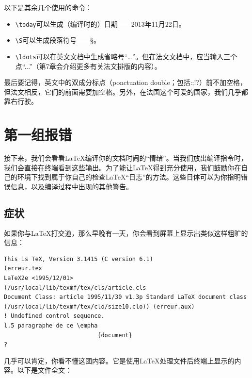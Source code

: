 以下是其余几个使用的命令：

\begin{itemize}
    \item \verb|\today|可以生成（编译时的）日期——2013年11月22日。
    \item \verb|\S|可以生成段落符号——\S。
    \item \verb|\ldots|可以在英文文档中生成省略号“\ldots”。但在法文文档中，应当输入三个点“...”（第7章会介绍更多有关法文排版的内容）。%
\end{itemize}

最后要记得，英文中的双成分标点（ponctuation double；包括:;!?）前不加空格，但法文相反，它们的前面需要加空格。另外，在法国这个可爱的国家，我们几乎都靠右行驶。

\section{第一组报错}

\begin{ii}
    接下来，我们会看看\LaTeX 编译你的文档时闹的“情绪”。当我们放出编译指令时，我们会直接在终端看到这些输出。为了能让\LaTeX 得到充分使用，我们鼓励你在自己的环境下找到属于你自己的检查\LaTeX “\textsf{日志}”的方法。这些日体可以为你指明错误信息，以及编译过程中出现的其他警告。
\end{ii}

\subsection{症状}

如果你与\LaTeX 打交道，那么早晚有一天，你会看到屏幕上显示出类似这样粗旷的信息：

\begin{dmd}
    \linenumbers
    \begin{verbatim}
This is TeX, Version 3.1415 (C version 6.1)
(erreur.tex
LaTeX2e <1995/12/01>
(/usr/local/lib/texmf/tex/cls/article.cls
Document Class: article 1995/11/30 v1.3p Standard LaTeX document class
(/usr/local/lib/texmf/tex/clo/size10.clo)) (erreur.aux)
! Undefined control sequence.
l.5 paragraphe de ce \empha
                           {document}
?\end{verbatim}
\end{dmd}

几乎可以肯定，你看不懂这团内容。它是使用\LaTeX 处理文件后终端上显示的内容。以下是文件全文：

